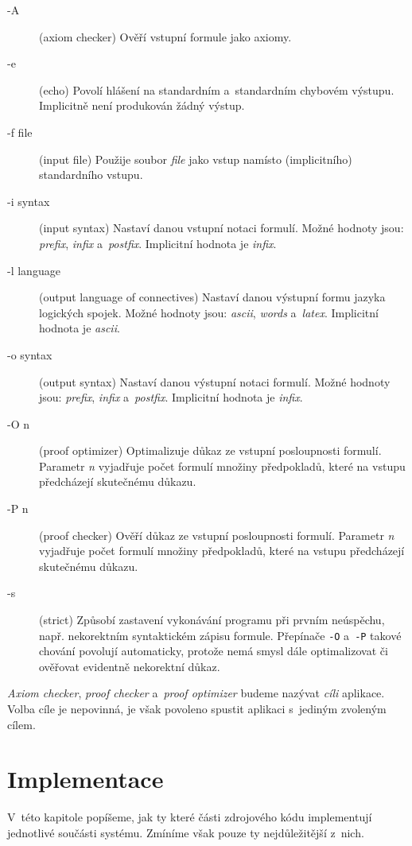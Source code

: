 \documentclass[thesis=B,czech,hidelinks]{thesis}[2012/06/26]
\begin{document}
\begin{description}
	\item[-A] (axiom checker) Ověří vstupní formule jako axiomy.
	\item[-e] (echo) Povolí hlášení na standardním a~standardním chybovém výstupu. Implicitně není produkován žádný výstup.
	\item[-f file] (input file) Použije soubor \emph{file} jako vstup namísto (implicitního) standardního vstupu.
	\item[-i syntax] (input syntax) Nastaví danou vstupní notaci formulí. Možné hodnoty jsou: \emph{prefix}, \emph{infix} a~\emph{postfix}. Implicitní hodnota je \emph{infix}.
	\item[-l language] (output language of connectives) Nastaví danou výstupní formu jazyka logických spojek. Možné hodnoty jsou: \emph{ascii}, \emph{words} a~\emph{latex}. Implicitní hodnota je \emph{ascii}.
	\item[-o syntax] (output syntax) Nastaví danou výstupní notaci formulí. Možné hodnoty jsou: \emph{prefix}, \emph{infix} a~\emph{postfix}. Implicitní hodnota je \emph{infix}.
	\item[-O n] (proof optimizer) Optimalizuje důkaz ze vstupní posloupnosti formulí. Parametr \emph{n} vyjadřuje počet formulí množiny předpokladů, které na vstupu předcházejí skutečnému důkazu.
	\item[-P n] (proof checker) Ověří důkaz ze vstupní posloupnosti formulí. Parametr \emph{n} vyjadřuje počet formulí množiny předpokladů, které na vstupu předcházejí skutečnému důkazu.
	\item[-s] (strict) Způsobí zastavení vykonávání programu při prvním neúspěchu, např. nekorektním syntaktickém zápisu formule. Přepínače \texttt{-O} a~\texttt{-P} takové chování povolují automaticky, protože nemá smysl dále optimalizovat či ověřovat evidentně nekorektní důkaz.
\end{description}

\emph{Axiom checker}, \emph{proof checker} a~\emph{proof optimizer} budeme nazývat \emph{cíli} aplikace. Volba cíle je nepovinná, je však povoleno spustit aplikaci s~jediným zvoleným cílem.

%
%
%

\chapter{Implementace}

V~této kapitole popíšeme, jak ty které části zdrojového kódu implementují jednotlivé součásti systému. Zmíníme však pouze ty nejdůležitější z~nich.
\end{document}
